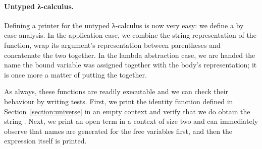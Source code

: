 \paragraph*{Untyped λ-calculus.} Defining a printer for the untyped
λ-calculus is now very easy: we define a  by case analysis.
In the application case, we combine the string representation of the
function, wrap its argument's representation between parentheses and
concatenate the two together. In the lambda abstraction case, we are
handed the name the bound variable was assigned together with the body's
representation; it is once more a matter of putting the 
together.

\begin{agdasnippet}
\end{agdasnippet}

As always, these functions are readily executable and we can check
their behaviour by writing tests. First, we print the identity function
defined in Section~\ref{section:universe}
in an empty context and verify that we do obtain the string .
Next, we print an open term in a context of size two and can immediately
observe that names are generated for the free variables first, and then the
expression itself is printed.

  \begin{agdasnippet}
  \end{agdasnippet}
  \begin{agdasnippet}
  \end{agdasnippet}
